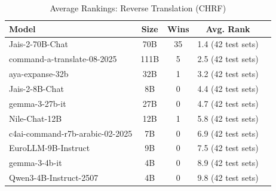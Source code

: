 \begin{table}[htbp]
\centering
\caption{Average Rankings: Reverse Translation (CHRF)}
\label{tab:avg_rankings_chrf}
\begin{tabular}{l@{\hspace{3pt}}c@{\hspace{3pt}}c@{\hspace{3pt}}c@{\hspace{3pt}}c}
\toprule
Model & Size & Wins & Avg. Rank \\
\midrule
Jais-2-70B-Chat & 70B & 35 & 1.4 (42 test sets) \\
command-a-translate-08-2025 & 111B & 5 & 2.5 (42 test sets) \\
aya-expanse-32b & 32B & 1 & 3.2 (42 test sets) \\
Jais-2-8B-Chat & 8B & 0 & 4.4 (42 test sets) \\
gemma-3-27b-it & 27B & 0 & 4.7 (42 test sets) \\
Nile-Chat-12B & 12B & 1 & 5.8 (42 test sets) \\
c4ai-command-r7b-arabic-02-2025 & 7B & 0 & 6.9 (42 test sets) \\
EuroLLM-9B-Instruct & 9B & 0 & 7.5 (42 test sets) \\
gemma-3-4b-it & 4B & 0 & 8.9 (42 test sets) \\
Qwen3-4B-Instruct-2507 & 4B & 0 & 9.8 (42 test sets) \\
\bottomrule
\end{tabular}
\end{table}